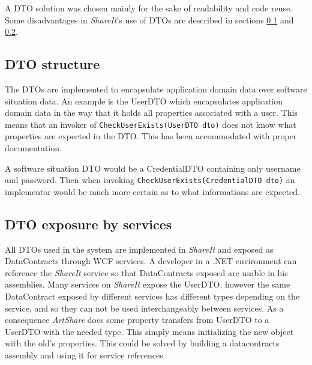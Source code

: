 \documentclass[../report.tex]{subfiles}
\begin{document}
A DTO solution was chosen mainly for the sake of readability and code reuse. Some disadvantages in \textit{ShareIt}'s use of DTOs are described in sections \ref{sec:dtoStructure} and \ref{sec:dtoExposition}.

\subsection{DTO structure}
\label{sec:dtoStructure}

The DTOs are implemented to encapsulate application domain data over software situation data. An example is the UserDTO which encapsulates application domain data in the way that it holds all properties associated with a user. This means that an invoker of \texttt{CheckUserExists(UserDTO dto)} does not know what properties are expected in the DTO. This has been accommodated with proper documentation.

A software situation DTO would be a CredentialDTO containing only username and password. Then when invoking \texttt{CheckUserExists(CredentialDTO dto)} an implementor would be much more certain as to what informations are expected.






\subsection{DTO exposure by services}
\label{sec:dtoExposition}

All DTOs used in the system are implemented in \textit{ShareIt} and exposed as DataContracts through WCF services. A developer in a .NET environment can reference the \textit{ShareIt} service so that DataContracts exposed are usable in his assemblies. Many services on \textit{ShareIt} expose the UserDTO, however the same DataContract exposed by different services has different types depending on the service, and so they can not be used interchangeably between services. As a consequence \textit{ArtShare} does some property transfers from UserDTO to a UserDTO with the needed type. This simply means initializing the new object with the old's properties. This could be solved by building a datacontracts assembly and using it for service references \cite{freddes2010}
\end{document}
